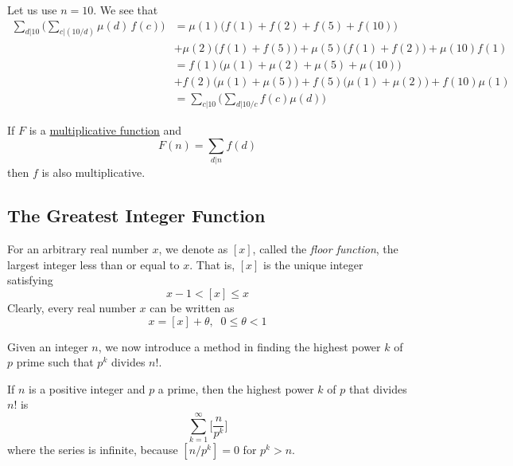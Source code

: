 \documentclass{article}
\newcounter{theorem}[section]
\newcounter{definition}[section]
\newcounter{example}[section]
\begin{document}
\begin{example}[Möbius Inversion for $n = 10$]
  \label{ex:mobius-inversion-for-n10}
Let us use $n=10$. We see that
\begin{align*}
    \sum_{d|10} \bigg( \sum_{c|(10/d)} \mu(d) \, f(c) \bigg) & = \mu(1) \big( f(1) + f(2) + f(5) + f(10)\big)  \\
    & + \mu(2) \big( f(1) + f(5)\big) + \mu(5) \big( f(1) + f(2) \big) + \mu(10) f(1) \\
    & = f(1) \big( \mu(1) + \mu(2) + \mu(5) + \mu(10)\big) \\
    & + f(2) \big(\mu(1) + \mu(5) \big) + f(5) \big( \mu(1) + \mu(2) \big) + f(10) \mu(1) \\
    & = \sum_{c|10} \bigg( \sum_{d|10/c} f(c) \mu(d) \bigg)
\end{align*}
\end{example}

\begin{lemma}
  \label{thm:multiplicativity-descends-through-divisor-sums}
If $F$ is a \hyperref[def:multiplicative-function]{multiplicative function} and 
\begin{equation}
  F(n) = \sum_{d|n} f(d)
\end{equation}
then $f$ is also multiplicative. 
\end{lemma}

\subsection{The Greatest Integer Function}

\begin{definition}
  \label{def:floor-function}
For an arbitrary real number $x$, we denote as $[x]$, called the \textit{floor function}, the largest integer less than or equal to $x$. That is, $[x]$ is the unique integer satisfying
\begin{equation}
  x-1 < [x] \leq x
\end{equation}
Clearly, every real number $x$ can be written as
\begin{equation}
  x = [x] + \theta, \;\; 0 \leq \theta < 1
\end{equation}
\end{definition}

Given an integer $n$, we now introduce a method in finding the highest power $k$ of $p$ prime such that $p^k$ divides $n!$. 

\begin{theorem}
  \label{thm:legendres-formula-for-the-prime-power-in-n}
If $n$ is a positive integer and $p$ a prime, then the highest power $k$ of $p$ that divides $n!$ is 
\begin{equation}
  \sum_{k=1}^\infty \bigg[ \frac{n}{p^k} \bigg]
\end{equation}
where the series is infinite, because $[n/p^k] = 0$ for $p^k > n$. 
\end{theorem}
\end{document}
